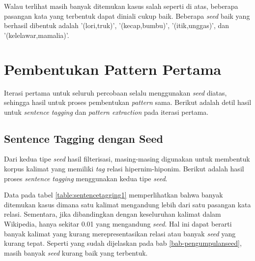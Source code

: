 Walau terlihat masih banyak ditemukan kasus salah seperti di atas, beberapa pasangan kata yang terbentuk dapat diniali cukup baik. Beberapa \textit{seed} baik yang berhasil dibentuk adalah '(lori,truk)', '(kecap,bumbu)', '(itik,unggas)', dan '(kelelawar,mamalia)'.

\section{Pembentukan Pattern Pertama}
Iterasi pertama untuk seluruh percobaan selalu menggunakan \textit{seed} diatas, sehingga hasil untuk proses pembentukan \textit{pattern} sama. Berikut adalah detil hasil untuk \textit{sentence tagging} dan \textit{pattern extraction} pada iterasi pertama.

\subsection{Sentence Tagging dengan Seed}
Dari kedua tipe \textit{seed} hasil filterisasi, masing-masing digunakan untuk membentuk korpus kalimat yang memiliki \textit{tag} relasi hipernim-hiponim. Berikut adalah hasil proses \textit{sentence tagging} menggunakan kedua tipe \textit{seed}.

\begin{table}
  \centering
  \caption{Hasil \textit{sentence tagging} dengan \textit{seed}}
  \label{table:sentencetagging1}
\end{table}

\noindent Data pada tabel \ref{table:sentencetagging1} memperlihatkan bahwa banyak ditemukan kasus dimana satu kalimat mengandung lebih dari satu pasangan kata relasi. Sementara, jika dibandingkan dengan keseluruhan kalimat dalam Wikipedia, hanya sekitar 0.01 yang mengandung \textit{seed}. Hal ini dapat berarti banyak kalimat yang kurang merepresentasikan relasi atau banyak \textit{seed} yang kurang tepat. Seperti yang sudah dijelaskan pada bab \ref{bab-pengumpulanseed}, masih banyak \textit{seed} kurang baik yang terbentuk.

